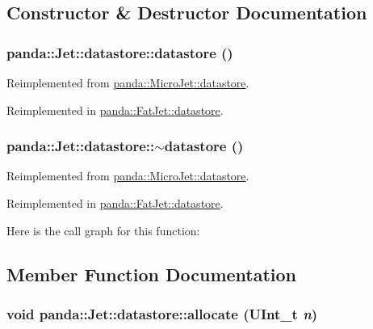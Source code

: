 \subsection{Constructor \& Destructor Documentation}
\hypertarget{structpanda_1_1Jet_1_1datastore_ae927a2e58d5ac6418b839d01dac0bd37}{
\subsubsection[{datastore}]{\setlength{\rightskip}{0pt plus 5cm}panda::Jet::datastore::datastore ()}}
\label{structpanda_1_1Jet_1_1datastore_ae927a2e58d5ac6418b839d01dac0bd37}


Reimplemented from \hyperlink{structpanda_1_1MicroJet_1_1datastore_adac05a4e9f5487a0932162ad3781f8aa}{panda::MicroJet::datastore}.

Reimplemented in \hyperlink{structpanda_1_1FatJet_1_1datastore_a9705a085f7cb1355b03cbfff4f580dbf}{panda::FatJet::datastore}.\hypertarget{structpanda_1_1Jet_1_1datastore_a70fb643b535f39f676287fe34d603e01}{
\subsubsection[{$\sim$datastore}]{\setlength{\rightskip}{0pt plus 5cm}panda::Jet::datastore::$\sim$datastore ()}}
\label{structpanda_1_1Jet_1_1datastore_a70fb643b535f39f676287fe34d603e01}


Reimplemented from \hyperlink{structpanda_1_1MicroJet_1_1datastore_a35979d6037e5229b018a32e3d0700360}{panda::MicroJet::datastore}.

Reimplemented in \hyperlink{structpanda_1_1FatJet_1_1datastore_ab30c9e78310606976935325a55cb10e6}{panda::FatJet::datastore}.

Here is the call graph for this function:

\subsection{Member Function Documentation}
\hypertarget{structpanda_1_1Jet_1_1datastore_a899f59963d18c2c13019d9ed27eb7745}{
\subsubsection[{allocate}]{\setlength{\rightskip}{0pt plus 5cm}void panda::Jet::datastore::allocate (UInt\_\-t {\em n})}}
\label{structpanda_1_1Jet_1_1datastore_a899f59963d18c2c13019d9ed27eb7745}


